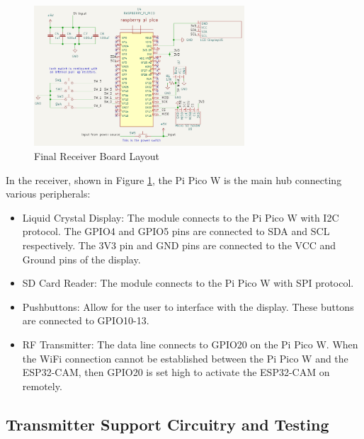 \documentclass[class=report,11pt,crop=false]{standalone}
\begin{document}
\begin{figure}[h]
\centering
\includegraphics[width=0.7\textwidth]{Images/Receiver_layout.png}
\caption{Final Receiver Board Layout}
\label{fig:R_Schem}
\end{figure}

In the receiver, shown in Figure \ref{fig:R_Schem}, the Pi Pico W is the main hub connecting various peripherals:
\begin{itemize}
    \item Liquid Crystal Display: The module connects to the Pi Pico W with I2C protocol. The GPIO4 and GPIO5 pins are connected to SDA and SCL respectively. The 3V3 pin and GND pins are connected to the VCC and Ground pins of the display. 
    \item SD Card Reader: The module connects to the Pi Pico W with SPI protocol. 
    \item Pushbuttons: Allow for the user to interface with the display. These buttons are connected to GPIO10-13. 
    \item RF Transmitter: The data line connects to GPIO20 on the Pi Pico W. When the WiFi connection cannot be established between the Pi Pico W and the ESP32-CAM, then GPIO20 is set high to activate the ESP32-CAM on remotely. 
\end{itemize}



\subsection{Transmitter Support Circuitry and Testing}
\end{document}
